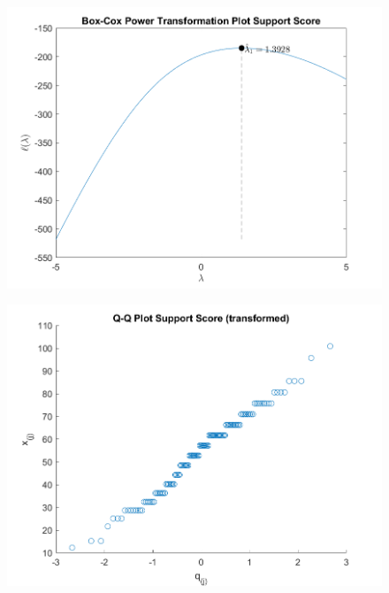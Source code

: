 \begin{enumerate}[label= (\alph*)]
    \begin{center}
        \begin{figure}[H]
            \centering
            \includegraphics[scale=0.4]{./matlab/chapter-4/sol4.39.power.2.png}
        \end{figure}
    \end{center}
    
    \begin{center}
        \begin{figure}[H]
            \centering
            \includegraphics[scale=0.4]{./matlab/chapter-4/sol4.39.qq.tr.2.png}
        \end{figure}
    \end{center}


\end{enumerate}
